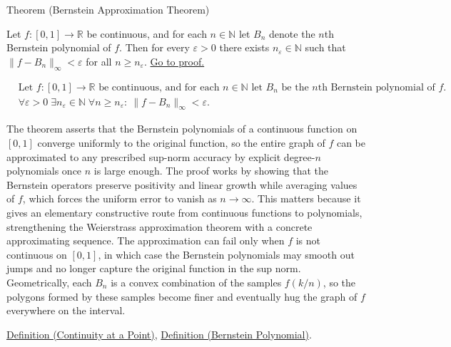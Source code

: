 \NoLocalDependencies

\begin{theorembox}{Theorem (Bernstein Approximation Theorem)}
\begin{theorem}
\label{thm:bernstein-approximation}
Let $f:[0,1]\to\mathbb{R}$ be continuous, and for each $n\in\mathbb{N}$ let $B_n$ denote the $n$th Bernstein polynomial of $f$. Then for every $\varepsilon>0$ there exists $n_\varepsilon\in\mathbb{N}$ such that $\|f-B_n\|_\infty<\varepsilon$ for all $n\ge n_\varepsilon$. \hyperref[prf:bernstein-approximation]{Go to proof.}
\end{theorem}
\end{theorembox}

\begin{remark*}
\[
\begin{aligned}
&\text{Let } f:[0,1]\to\mathbb{R} \text{ be continuous, and for each } n\in\mathbb{N} \text{ let } B_n \text{ be the $n$th Bernstein polynomial of } f.\\
&\forall \varepsilon>0\;\exists n_\varepsilon\in\mathbb{N}\;\forall n\ge n_\varepsilon:\ \|f-B_n\|_\infty<\varepsilon.
\end{aligned}
\]
\end{remark*}

\begin{remark*}[Interpretation]
The theorem asserts that the Bernstein polynomials of a continuous function on $[0,1]$ converge uniformly to the original function, so the entire graph of $f$ can be approximated to any prescribed sup-norm accuracy by explicit degree-$n$ polynomials once $n$ is large enough. The proof works by showing that the Bernstein operators preserve positivity and linear growth while averaging values of $f$, which forces the uniform error to vanish as $n\to\infty$. This matters because it gives an elementary constructive route from continuous functions to polynomials, strengthening the Weierstrass approximation theorem with a concrete approximating sequence. The approximation can fail only when $f$ is not continuous on $[0,1]$, in which case the Bernstein polynomials may smooth out jumps and no longer capture the original function in the sup norm. Geometrically, each $B_n$ is a convex combination of the samples $f(k/n)$, so the polygons formed by these samples become finer and eventually hug the graph of $f$ everywhere on the interval.
\end{remark*}

\begin{remark*}[Dependencies]
\hyperref[def:continuous-at-point]{Definition (Continuity at a Point)}, \hyperref[def:bernstein-polynomial]{Definition (Bernstein Polynomial)}.
\end{remark*}
